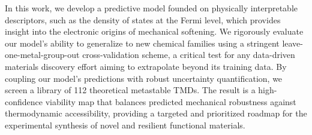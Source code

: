 \documentclass[]{article}
\begin{document}
In this work, we develop a predictive model founded on physically interpretable descriptors, such as the density of states at the Fermi level, which provides insight into the electronic origins of mechanical softening.\citep{Duan_2025,chen2025universalmaterialpropertyprediction,Zhang_2023} We rigorously evaluate our model's ability to generalize to new chemical families using a stringent leave-one-metal-group-out cross-validation scheme, a critical test for any data-driven materials discovery effort aiming to extrapolate beyond its training data.\citep{veillon2025chemicallygroundedevaluationframework} By coupling our model's predictions with robust uncertainty quantification\citep{Guan_2019}, we screen a library of 112 theoretical metastable TMDs.\citep{park2024exploring,Gou_2024} The result is a high-confidence viability map that balances predicted mechanical robustness against thermodynamic accessibility, providing a targeted and prioritized roadmap for the experimental synthesis of novel and resilient functional materials.\citep{park2024exploring,Duan_2025,Zhang_2023,Gou_2024,Gao_2025}
\end{document}

